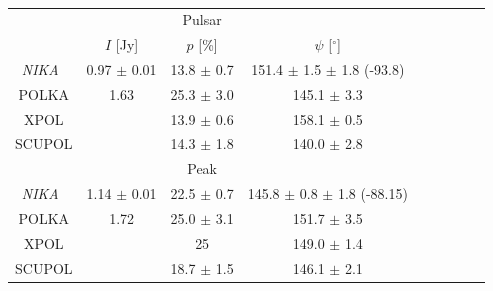 \documentclass[twocolumn,traditabstract]{aa}
\def\NIKA{\textit{NIKA}}
\begin{document}
 \begin{table}
  \centering
      \begin{tabular}{ccccccccc}
      \hline
      \hline
      & &  Pulsar & & \\
       & $I$ [Jy]& $p$ [\%] & $\psi$ [$^\circ$] \\ 
       \hline
      \NIKA\ & 0.97 $\pm$ 0.01 & 13.8 $\pm$ 0.7 & 151.4 $\pm$ 1.5 $\pm$ 1.8 (-93.8)&\\
                                         
      POLKA & 1.63 & 25.3 $\pm$ 3.0 & 145.1 $\pm$ 3.3 & \\
      XPOL  & & 13.9 $\pm$ 0.6 & 158.1 $\pm$ 0.5 &  \\
      SCUPOL & & 14.3 $\pm$ 1.8 & 140.0 $\pm$ 2.8& \\
      \hline
      \hline
       & &  Peak & & \\
       \hline
        \NIKA\ &1.14 $\pm$ 0.01 & 22.5 $\pm$ 0.7 & 145.8 $\pm$ 0.8 $\pm$ 1.8 (-88.15)\\                                        
      POLKA & 1.72 & 25.0 $\pm$ 3.1 & 151.7 $\pm$ 3.5 &  \\
      XPOL  & & 25 & 149.0 $\pm $ 1.4 &  \\
      SCUPOL & & 18.7 $\pm$ 1.5 & 146.1 $\pm$ 2.1&\\
  
     \hline            
    \hline   
    \end{tabular}
   \caption{ }
    \label{tab:crab_comparison}
 \end{table}
  
\end{document}
